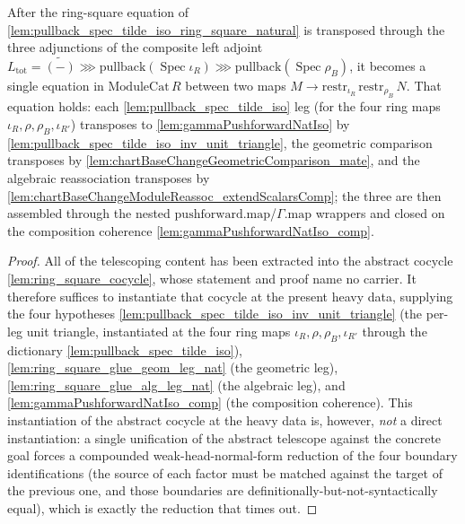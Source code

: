 \begin{lemma}


  \label{lem:pullback_spec_tilde_iso_ring_square_mate_glue}
  After the ring-square equation of \cref{lem:pullback_spec_tilde_iso_ring_square_natural} is
  transposed through the three adjunctions of the composite left adjoint
  \(L_{\mathrm{tot}} = \widetilde{(-)} \ggg \mathrm{pullback}(\operatorname{Spec}\iota_R) \ggg
  \mathrm{pullback}(\operatorname{Spec}\rho_B)\), it becomes a single equation in
  \(\mathrm{ModuleCat}\,R\) between two maps \(M \to \mathrm{restr}_{\iota_R}\,\mathrm{restr}_{\rho_B}\,N\).
  That equation holds: each \cref{lem:pullback_spec_tilde_iso} leg (for the four ring maps
  \(\iota_R,\rho,\rho_B,\iota_{R'}\)) transposes to \cref{lem:gammaPushforwardNatIso} by
  \cref{lem:pullback_spec_tilde_iso_inv_unit_triangle}, the geometric comparison transposes by
  \cref{lem:chartBaseChangeGeometricComparison_mate}, and the algebraic reassociation transposes by
  \cref{lem:chartBaseChangeModuleReassoc_extendScalarsComp}; the three are then assembled through the
  nested \(\mathrm{pushforward}.\mathrm{map}\)/\(\Gamma.\mathrm{map}\) wrappers and closed on the
  composition coherence \cref{lem:gammaPushforwardNatIso_comp}.
  \begin{proof}
    All of the telescoping content has been extracted into the abstract cocycle
    \cref{lem:ring_square_cocycle}, whose statement and proof name no carrier. It therefore suffices to
    instantiate that cocycle at the present heavy data, supplying the four hypotheses
    \cref{lem:pullback_spec_tilde_iso_inv_unit_triangle} (the per-leg unit triangle, instantiated at the
    four ring maps \(\iota_R,\rho,\rho_B,\iota_{R'}\) through the dictionary
    \cref{lem:pullback_spec_tilde_iso}), \cref{lem:ring_square_glue_geom_leg_nat} (the geometric leg),
    \cref{lem:ring_square_glue_alg_leg_nat} (the algebraic leg), and
    \cref{lem:gammaPushforwardNatIso_comp} (the composition coherence). This instantiation of the abstract
    cocycle at the heavy data is, however, \emph{not} a direct instantiation: a single unification of the
    abstract telescope against the concrete goal forces a compounded weak-head-normal-form reduction of
    the four boundary identifications (the source of each factor must be matched against the target of the
    previous one, and those boundaries are definitionally-but-not-syntactically equal), which is exactly
    the reduction that times out.


\end{proof}
\end{lemma}
